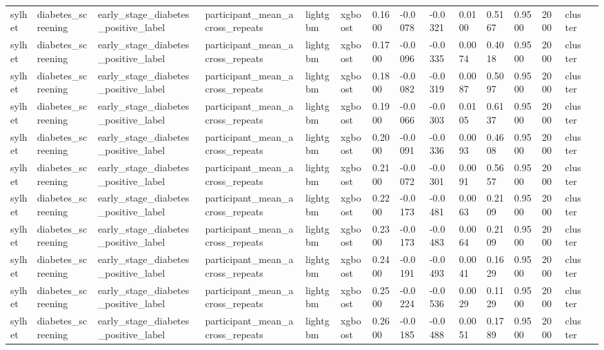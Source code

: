\begin{tabular}{lllllllllllllll}
sylhet & diabetes\_screening & early\_stage\_diabetes\_positive\_label & participant\_mean\_across\_repeats & lightgbm & xgboost & 0.1600 & -0.0078 & -0.0321 & 0.0100 & 0.5167 & 0.9500 & 2000 & cluster &  \\
sylhet & diabetes\_screening & early\_stage\_diabetes\_positive\_label & participant\_mean\_across\_repeats & lightgbm & xgboost & 0.1700 & -0.0096 & -0.0335 & 0.0074 & 0.4018 & 0.9500 & 2000 & cluster &  \\
sylhet & diabetes\_screening & early\_stage\_diabetes\_positive\_label & participant\_mean\_across\_repeats & lightgbm & xgboost & 0.1800 & -0.0082 & -0.0319 & 0.0087 & 0.5097 & 0.9500 & 2000 & cluster &  \\
sylhet & diabetes\_screening & early\_stage\_diabetes\_positive\_label & participant\_mean\_across\_repeats & lightgbm & xgboost & 0.1900 & -0.0066 & -0.0303 & 0.0105 & 0.6137 & 0.9500 & 2000 & cluster &  \\
sylhet & diabetes\_screening & early\_stage\_diabetes\_positive\_label & participant\_mean\_across\_repeats & lightgbm & xgboost & 0.2000 & -0.0091 & -0.0336 & 0.0093 & 0.4608 & 0.9500 & 2000 & cluster &  \\
sylhet & diabetes\_screening & early\_stage\_diabetes\_positive\_label & participant\_mean\_across\_repeats & lightgbm & xgboost & 0.2100 & -0.0072 & -0.0301 & 0.0091 & 0.5657 & 0.9500 & 2000 & cluster &  \\
sylhet & diabetes\_screening & early\_stage\_diabetes\_positive\_label & participant\_mean\_across\_repeats & lightgbm & xgboost & 0.2200 & -0.0173 & -0.0481 & 0.0063 & 0.2109 & 0.9500 & 2000 & cluster &  \\
sylhet & diabetes\_screening & early\_stage\_diabetes\_positive\_label & participant\_mean\_across\_repeats & lightgbm & xgboost & 0.2300 & -0.0173 & -0.0483 & 0.0064 & 0.2109 & 0.9500 & 2000 & cluster &  \\
sylhet & diabetes\_screening & early\_stage\_diabetes\_positive\_label & participant\_mean\_across\_repeats & lightgbm & xgboost & 0.2400 & -0.0191 & -0.0493 & 0.0041 & 0.1629 & 0.9500 & 2000 & cluster &  \\
sylhet & diabetes\_screening & early\_stage\_diabetes\_positive\_label & participant\_mean\_across\_repeats & lightgbm & xgboost & 0.2500 & -0.0224 & -0.0536 & 0.0029 & 0.1129 & 0.9500 & 2000 & cluster &  \\
sylhet & diabetes\_screening & early\_stage\_diabetes\_positive\_label & participant\_mean\_across\_repeats & lightgbm & xgboost & 0.2600 & -0.0185 & -0.0488 & 0.0051 & 0.1789 & 0.9500 & 2000 & cluster &  \\

\end{tabular}
